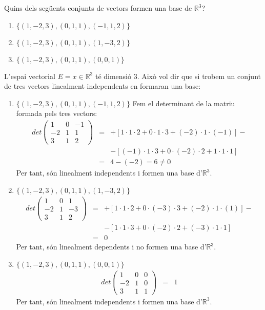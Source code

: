 \Exercise Quins dels següents conjunts de vectors formen una base de $\mathbb{R}^3$?
  \begin{enumerate}[label=(\alph*)]
    \item $\{(1,-2,3),(0,1,1),(-1,1,2)\}$
    \item $\{(1,-2,3),(0,1,1),(1,-3,2)\}$
    \item $\{(1,-2,3),(0,1,1),(0,0,1)\}$
  \end{enumerate}

\Answer L'espai vectorial $E={x\in \mathbb{R}^3}$ té dimensió 3. Això vol dir que si trobem un conjunt de tres vectors linealment independents en formaran una base:
\begin{enumerate}[label=(\alph*)]
  \item $\{(1,-2,3),(0,1,1),(-1,1,2)\}$
  Fem el determinant de la matriu formada pels tres vectors:
  \begin{eqnarray*}
    det \begin{pmatrix}1&0&-1\\-2&1&1\\3&1&2\end{pmatrix}&=&
    +[1\cdot1\cdot2+0\cdot1\cdot3+(-2)\cdot1\cdot(-1)]-\\
    &&-[(-1)\cdot1\cdot3+0\cdot(-2)\cdot2+1\cdot1\cdot1]\\
    &=&4-(-2)=6 \neq 0
  \end{eqnarray*}
  Per tant, són linealment independents i formen una base d'$\mathbb{R}^3$.
  \blacksquare

  \item $\{(1,-2,3),(0,1,1),(1,-3,2)\}$
  \begin{eqnarray*}
    det \begin{pmatrix}1&0&1\\-2&1&-3\\3&1&2\end{pmatrix}&=&
    +[1\cdot1\cdot2+0\cdot(-3)\cdot3+(-2)\cdot1\cdot(1)]-\\
    &&-[1\cdot1\cdot3+0\cdot(-2)\cdot2+(-3)\cdot1\cdot1]\\
    &=&0
  \end{eqnarray*}
  Per tant, són linealment dependents i no formen una base d'$\mathbb{R}^3$.
  \blacksquare

  \item $\{(1,-2,3),(0,1,1),(0,0,1)\}$
  \begin{eqnarray*}
    det \begin{pmatrix}1&0&0\\-2&1&0\\3&1&1\end{pmatrix}&=&
    1
  \end{eqnarray*}
  Per tant, són linealment independents i formen una base d'$\mathbb{R}^3$.
  \blacksquare

\end{enumerate}
